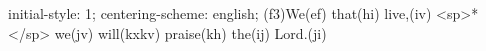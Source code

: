 initial-style: 1;
centering-scheme: english;
(f3)We(ef) that(hi) live,(iv) <sp>*</sp> we(jv) will(kxkv) praise(kh) the(ij) Lord.(ji)